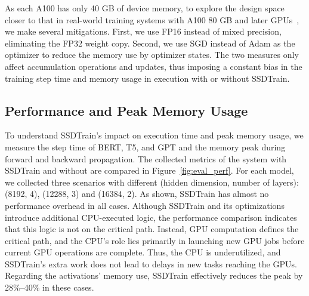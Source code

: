 As each A100 has only 40 GB of device memory, to explore the design space closer to that in real-world training systems with A100 80 GB and later GPUs~\cite{shoeybiMegatronLMTrainingMultiBillion2020a,liuWinnerTakeAllColumnRow2023}, we make several mitigations. First, we use FP16 instead of mixed precision, eliminating the FP32 weight copy. Second, we use SGD instead of Adam as the optimizer to reduce the memory use by optimizer states. The two measures only affect accumulation operations and  updates, thus imposing a constant bias in the training step time and memory usage in execution with or without SSDTrain.





\subsection{Performance and Peak Memory Usage}
\label{sec:exp_baseline}


To understand SSDTrain's impact on execution time and peak memory usage, we measure the step time of BERT, T5, and GPT and the memory peak during forward and backward propagation. The collected metrics of the system with SSDTrain and without are compared in Figure~\ref{fig:eval_perf}. For each model, we collected three scenarios with different (hidden dimension, number of layers): (8192, 4), (12288, 3) and (16384, 2). As shown, SSDTrain has almost no performance overhead in all cases. Although SSDTrain and its optimizations introduce additional CPU-executed logic, the performance comparison indicates that this logic is not on the critical path. Instead, GPU computation defines the critical path, and the CPU's role lies primarily in launching new GPU jobs before current GPU operations are complete.  Thus, the CPU is underutilized, and SSDTrain's extra work does not lead to delays in new tasks reaching the GPUs. 
Regarding the activations' memory use, SSDTrain effectively reduces the peak by 28\%--40\% in these cases.










